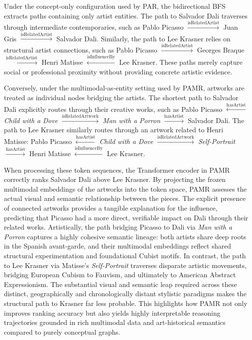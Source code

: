 \documentclass[runningheads]{llncs}
\begin{document}
Under the concept-only configuration used by PAR, the bidirectional BFS extracts paths containing only artist entities. The path to Salvador Dali traverses through intermediate contemporaries, such as Pablo Picasso $\xrightarrow{\text{isRelatedArtist}}$ Juan Gris $\xrightarrow{\text{isRelatedArtist}}$ Salvador Dali. Similarly, the path to Lee Krasner relies on structural artist connections, such as Pablo Picasso $\xrightarrow{\text{isRelatedArtist}}$ Georges Braque $\xrightarrow{\text{isRelatedArtist}}$ Henri Matisse $\xleftarrow{\text{isInfluenceBy}}$ Lee Krasner. These paths merely capture social or professional proximity without providing concrete artistic evidence.

Conversely, under the multimodal-as-entity setting used by PAMR, artworks are treated as individual nodes bridging the artists. The shortest path to Salvador Dali explicitly routes through their creative works, such as Pablo Picasso $\xleftarrow{\text{hasArtist}}$ \textit{Child with a Dove} $\xrightarrow{\text{isRelatedArtwork}}$ \textit{Man with a Porron} $\xrightarrow{\text{hasArtist}}$ Salvador Dali. The path to Lee Krasner similarly routes through an artwork related to Henri Matisse: Pablo Picasso $\xleftarrow{\text{hasArtist}}$ \textit{Child with a Dove} $\xrightarrow{\text{isRelatedArtwork}}$ \textit{Self-Portrait} $\xrightarrow{\text{hasArtist}}$ Henri Matisse $\xleftarrow{\text{isInfluenceBy}}$ Lee Krasner.

When processing these token sequences, the Transformer encoder in PAMR correctly ranks Salvador Dali above Lee Krasner. By projecting the frozen multimodal embeddings of the artworks into the token space, PAMR assesses the actual visual and semantic relationship between the pieces. The explicit presence of connected artworks provides a tangible explanation for the influence, predicting that Picasso had a more direct, verifiable impact on Dali through their related works. Artistically, the path bridging Picasso to Dali via \textit{Man with a Porron} captures a highly cohesive semantic lineage: both artists share deep roots in the Spanish avant-garde, and their multimodal embeddings reflect shared structural experimentation and foundational Cubist motifs. In contrast, the path to Lee Krasner via Matisse's \textit{Self-Portrait} traverses disparate artistic movements, bridging European Cubism to Fauvism, and ultimately to American Abstract Expressionism. The substantial visual and semantic leap required across these distinct, geographically and chronologically distant stylistic paradigms makes the structural path to Krasner far less probable. This highlights how PAMR not only improves ranking accuracy but also yields highly interpretable reasoning trajectories grounded in rich multimodal data and art-historical semantics compared to purely conceptual graphs.
\end{document}
